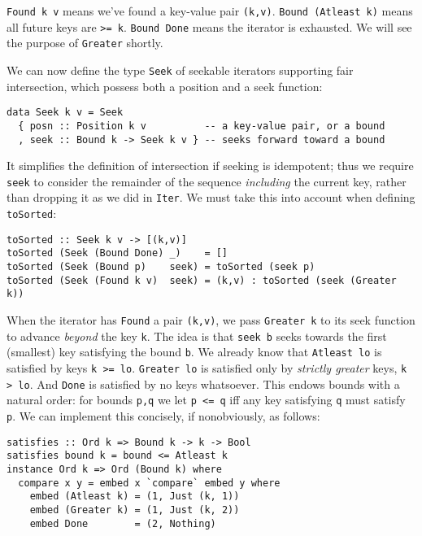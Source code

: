 \documentclass[acmsmall,screen,dvipsnames,svgnames]{acmart}
\newcommand\hask[1]{\texttt{#1}}
\newcommand\ttt\texttt
\newcommand\todo[1]{{\color{Orange}#1}}
\renewcommand\todo[1]{{\color{IndianRed}#1}}
\newcommand\oldtodo[1]{\todo{#1}}
\renewcommand\todo[1]{\ignorespaces}
\begin{document}
\noindent
\hask{Found k v} means we've found a key-value pair \ttt{(k,v)}.
\hask{Bound (Atleast k)} means all future keys are \ttt{>= k}.
\hask{Bound Done} means the iterator is exhausted.
We will see the purpose of \hask{Greater} shortly.

We can now define the type \hask{Seek} of seekable iterators supporting fair intersection, which possess both a position and a seek function:

\begin{verbatim}
data Seek k v = Seek
  { posn :: Position k v          -- a key-value pair, or a bound
  , seek :: Bound k -> Seek k v } -- seeks forward toward a bound
\end{verbatim}

\noindent
It simplifies the definition of intersection if seeking is idempotent; thus we require \ttt{seek} to consider the remainder of the sequence \emph{including} the current key, rather than dropping it as we did in \hask{Iter}.
We must take this into account when defining \ttt{toSorted}:

\begin{verbatim}
toSorted :: Seek k v -> [(k,v)]
toSorted (Seek (Bound Done) _)    = []
toSorted (Seek (Bound p)    seek) = toSorted (seek p)
toSorted (Seek (Found k v)  seek) = (k,v) : toSorted (seek (Greater k))
\end{verbatim}

\noindent
\oldtodo{TODO: also need to explain the \hask{Bound k} case where we retry!}
When the iterator has \hask{Found} a pair \ttt{(k,v)}, we pass \hask{Greater k} to its seek function to advance \emph{beyond} the key \ttt{k}.
The idea is that \ttt{seek b} seeks towards the first (smallest) key satisfying the bound \ttt{b}.
We already know that \hask{Atleast lo} is satisfied by keys \ttt{k >= lo}.
\hask{Greater lo} is satisfied only by \emph{strictly greater} keys, \ttt{k > lo}.
And \hask{Done} is satisfied by no keys whatsoever.
This endows bounds with a natural order: for bounds \ttt{p,q} we let \ttt{p <= q} iff any key satisfying \ttt{q} must satisfy \ttt{p}.
We can implement this concisely, if nonobviously, as follows:

\begin{verbatim}
satisfies :: Ord k => Bound k -> k -> Bool
satisfies bound k = bound <= Atleast k
instance Ord k => Ord (Bound k) where
  compare x y = embed x `compare` embed y where
    embed (Atleast k) = (1, Just (k, 1))
    embed (Greater k) = (1, Just (k, 2))
    embed Done        = (2, Nothing)
\end{verbatim}
\end{document}

